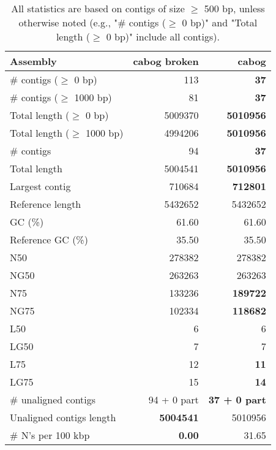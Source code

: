 \documentclass[12pt,a4paper]{article}
\begin{document}
\begin{table}[ht]
\begin{center}
\caption{All statistics are based on contigs of size $\geq$ 500 bp, unless otherwise noted (e.g., "\# contigs ($\geq$ 0 bp)" and "Total length ($\geq$ 0 bp)" include all contigs).}
\begin{tabular}{|l*{2}{|r}|}
\hline
Assembly & cabog broken & cabog \\ \hline
\# contigs ($\geq$ 0 bp) & 113 & {\bf 37} \\ \hline
\# contigs ($\geq$ 1000 bp) & 81 & {\bf 37} \\ \hline
Total length ($\geq$ 0 bp) & 5009370 & {\bf 5010956} \\ \hline
Total length ($\geq$ 1000 bp) & 4994206 & {\bf 5010956} \\ \hline
\# contigs & 94 & {\bf 37} \\ \hline
Total length & 5004541 & {\bf 5010956} \\ \hline
Largest contig & 710684 & {\bf 712801} \\ \hline
Reference length & 5432652 & 5432652 \\ \hline
GC (\%) & 61.60 & 61.60 \\ \hline
Reference GC (\%) & 35.50 & 35.50 \\ \hline
N50 & 278382 & 278382 \\ \hline
NG50 & 263263 & 263263 \\ \hline
N75 & 133236 & {\bf 189722} \\ \hline
NG75 & 102334 & {\bf 118682} \\ \hline
L50 & 6 & 6 \\ \hline
LG50 & 7 & 7 \\ \hline
L75 & 12 & {\bf 11} \\ \hline
LG75 & 15 & {\bf 14} \\ \hline
\# unaligned contigs & 94 + 0 part & {\bf 37 + 0 part} \\ \hline
Unaligned contigs length & {\bf 5004541} & 5010956 \\ \hline
\# N's per 100 kbp & {\bf 0.00} & 31.65 \\ \hline
\end{tabular}
\end{center}
\end{table}
\end{document}
